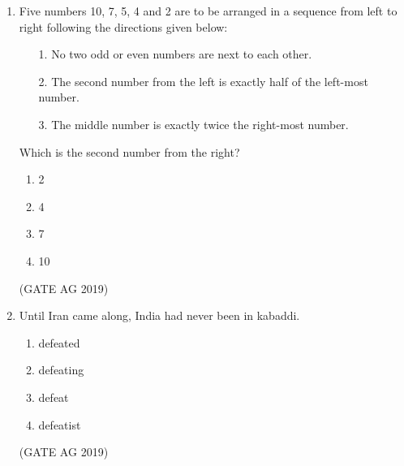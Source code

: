\documentclass[journal,12pt,onecolumn]{IEEEtran}
\theoremstyle{remark}
\begin{document}
\begin{enumerate}
\begin{multicols}{4}
\begin{enumerate}
\item 17.1
\item 21.0
\item 33.1
\item 72.8
\end{enumerate}
\end{multicols}
\hfill{(GATE AG 2019)}



\item Five numbers 10, 7, 5, 4 and 2 are to be arranged in a sequence from left to right following the directions given below:  

\begin{enumerate}
\item[1.] No two odd or even numbers are next to each other.  
\item[2.] The second number from the left is exactly half of the left-most number.  
\item[3.] The middle number is exactly twice the right-most number.  
\end{enumerate}



Which is the second number from the right?



\begin{multicols}{4}
\begin{enumerate}
\item 2
\item 4
\item 7
\item 10
\end{enumerate}
\end{multicols}
\hfill{(GATE AG 2019)}

\item Until Iran came along, India had never been \underline{\hspace{2cm}} in kabaddi.



\begin{multicols}{4}
\begin{enumerate}
\item defeated
\item defeating
\item defeat
\item defeatist
\end{enumerate}
\end{multicols}
\hfill{(GATE AG 2019)}


\end{enumerate}
\end{document}
